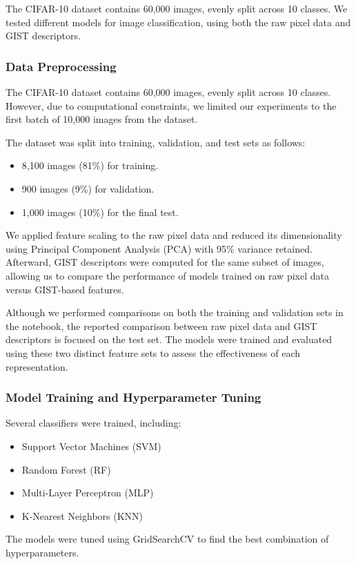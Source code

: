 \documentclass[twocolumn]{article}
\begin{document}
The CIFAR-10 dataset contains 60,000 images, evenly split across 10 classes. 
We tested different models for image classification, using both the raw pixel data and GIST descriptors.

\subsubsection{Data Preprocessing}
The CIFAR-10 dataset contains 60,000 images, evenly split across 10 classes. 
However, due to computational constraints, we limited our experiments to the first batch 
of 10,000 images from the dataset.

The dataset was split into training, validation, and test sets as follows:
\begin{itemize}
    \item 8,100 images (81\%) for training.
    \item 900 images (9\%) for validation.
    \item 1,000 images (10\%) for the final test.
\end{itemize}


We applied feature scaling to the raw pixel data and reduced its 
dimensionality using Principal Component Analysis (PCA) with 95\% variance retained. 
Afterward, GIST descriptors were computed for the same subset of images, allowing us to 
compare the performance of models trained on raw pixel data versus GIST-based features.

Although we performed comparisons on both the training and validation 
sets in the notebook, the reported comparison between raw pixel data and GIST descriptors 
is focused on the test set. The models were trained and evaluated using these two distinct 
feature sets to assess the effectiveness of each representation.

\subsubsection{Model Training and Hyperparameter Tuning}
Several classifiers were trained, including:
\begin{itemize}
    \item Support Vector Machines (SVM)
    \item Random Forest (RF)
    \item Multi-Layer Perceptron (MLP)
    \item K-Nearest Neighbors (KNN)
\end{itemize}
The models were tuned using GridSearchCV to find the best combination of hyperparameters.
\end{document}
